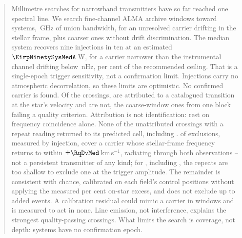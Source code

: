 \begin{abstract}
Millimetre searches for narrowband transmitters have so far reached one
spectral line.
We search \NWinA{} fine-channel ALMA archive windows toward \NSysClassA{}
systems, \CvUnionA\,GHz of union bandwidth, for an unresolved carrier drifting
in the stellar frame, plus \NWinB{} coarser ones without drift discrimination.
The median system recovers nine injections in ten at an estimated
$\EirpNinetySysMedA$\,W, for a carrier narrower than the instrumental channel
drifting below \DriftCeilLo\,nHz, \AccelSheikhPct{} per cent of the
recommended ceiling. That is a single-epoch trigger sensitivity, not a
confirmation limit. Injections carry no atmospheric decorrelation, so these
limits are optimistic.
No confirmed carrier is found. Of the \EvNCrossRaw{} crossings, \MkAttr{} are
attributed to a catalogued transition at the star's velocity and \MkUnattr{}
are not, the \PrFlagXrossWord{} coarse-window ones from one block failing a
quality criterion. Attribution is not identification: \LnAttrCoincWord{} rest
on frequency coincidence alone.
None of the \RcNExclPoss{} unattributed crossings with a repeat reading
returned to its predicted cell, including \PrRankClause.
\HjNPowerHi{} of \RcNExcl{} exclusions, measured by injection, cover a
carrier whose stellar-frame frequency returns to within
$\pm\RqDvMed$\,km\,s$^{-1}$, radiating through both observations -- not a
persistent transmitter of any kind; for \HjNPowerLo, including \EvBStar, the
repeats are too shallow to exclude one at the trigger amplitude.
The remainder is consistent with chance, calibrated on each field's control
positions without applying the measured \CeStepPct{} per cent on-star excess,
and does not exclude up to \CeAddLim{} added events. A calibration residual could
mimic a carrier in \CxNAdmit{} windows and is measured to act in none.
Line emission, not interference, explains the strongest quality-passing
crossings. What limits the search is coverage, not depth: \ZcNoRepSys{}
systems have no confirmation epoch.
\end{abstract}


